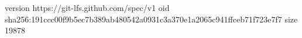 version https://git-lfs.github.com/spec/v1
oid sha256:191ccc00f9b5ec7b389ab480542a0931c3a370e1a2065c941ffceb71f723e7f7
size 19878
